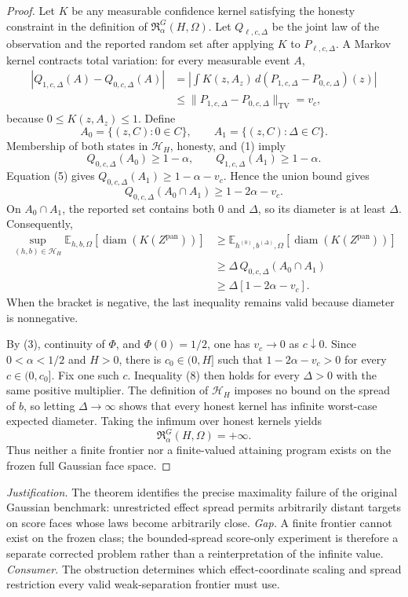\documentclass{article}
\begin{document}
\begin{proof}
Let \(K\) be any measurable confidence kernel satisfying the honesty constraint in the definition of \(\mathfrak R_{\alpha}^{G}(H,\Omega)\). Let \(Q_{\ell,c,\Delta}\) be the joint law of the observation and the reported random set after applying \(K\) to \(P_{\ell,c,\Delta}\). A Markov kernel contracts total variation: for every measurable event \(A\),
\[
\begin{aligned}
 |Q_{1,c,\Delta}(A)-Q_{0,c,\Delta}(A)|
 &=\left|\int K(z,A_z)\,d(P_{1,c,\Delta}-P_{0,c,\Delta})(z)\right|\\
 &\leq \lVert P_{1,c,\Delta}-P_{0,c,\Delta}\rVert_{\mathrm{TV}}
 =v_c,
\end{aligned}
\tag{5}
\]
because \(0\leq K(z,A_z)\leq1\). Define
\[
 A_0=\{(z,C):0\in C\},
 \qquad
 A_1=\{(z,C):\Delta\in C\}.
\]
Membership of both states in \(\mathcal H_H\), honesty, and (1) imply
\[
 Q_{0,c,\Delta}(A_0)\geq1-\alpha,
 \qquad
 Q_{1,c,\Delta}(A_1)\geq1-\alpha.
 \tag{6}
\]
Equation (5) gives \(Q_{0,c,\Delta}(A_1)\geq1-\alpha-v_c\). Hence the union bound gives
\[
 Q_{0,c,\Delta}(A_0\cap A_1)
 \geq1-2\alpha-v_c.
 \tag{7}
\]
On \(A_0\cap A_1\), the reported set contains both \(0\) and \(\Delta\), so its diameter is at least \(\Delta\). Consequently,
\[
\begin{aligned}
 \sup_{(h,b)\in\mathcal H_H}
 \mathbb E_{h,b,\Omega}[\operatorname{diam}(K(Z^{\mathrm{pan}}))]
 &\geq
 \mathbb E_{h^{(0)},b^{(\Delta)},\Omega}
 [\operatorname{diam}(K(Z^{\mathrm{pan}}))]\\
 &\geq \Delta\,Q_{0,c,\Delta}(A_0\cap A_1)\\
 &\geq \Delta[1-2\alpha-v_c].
\end{aligned}
\tag{8}
\]
When the bracket is negative, the last inequality remains valid because diameter is nonnegative.

By (3), continuity of \(\Phi\), and \(\Phi(0)=1/2\), one has \(v_c\to0\) as \(c\downarrow0\). Since \(0<\alpha<1/2\) and \(H>0\), there is \(c_0\in(0,H]\) such that \(1-2\alpha-v_c>0\) for every \(c\in(0,c_0]\). Fix one such \(c\). Inequality (8) then holds for every \(\Delta>0\) with the same positive multiplier. The definition of \(\mathcal H_H\) imposes no bound on the spread of \(b\), so letting \(\Delta\to\infty\) shows that every honest kernel has infinite worst-case expected diameter. Taking the infimum over honest kernels yields
\[
 \mathfrak R_{\alpha}^{G}(H,\Omega)=+\infty.
\]
Thus neither a finite frontier nor a finite-valued attaining program exists on the frozen full Gaussian face space.
\end{proof}
\par\smallskip\noindent \textit{Justification.} The theorem identifies the precise maximality failure of the original Gaussian benchmark: unrestricted effect spread permits arbitrarily distant targets on score faces whose laws become arbitrarily close. \textit{Gap.} A finite frontier cannot exist on the frozen class; the bounded-spread score-only experiment is therefore a separate corrected problem rather than a reinterpretation of the infinite value. \textit{Consumer.} The obstruction determines which effect-coordinate scaling and spread restriction every valid weak-separation frontier must use.
\end{document}
